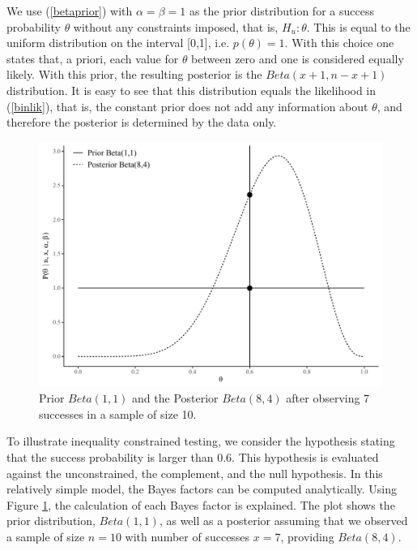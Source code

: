 \documentclass[11pt,reqno]{article}
\begin{document}
We use (\ref{betaprior}) with $\alpha=\beta=1$ as the prior distribution for a success probability $\theta$ without any constraints imposed, that is,  $H_u: \theta$. This is equal to the uniform distribution on the interval [0,1], i.e. $p(\theta) = 1$. With this choice one states that, a priori, each value for $\theta$ between zero and one is considered equally likely. With this prior, the resulting posterior is the $Beta(x+1, n-x+1)$ distribution. It is easy to see that this distribution equals the likelihood in (\ref{binlik}), that is, the constant prior does not add any information about $\theta$, and therefore the posterior is determined by the data only.

\begin{figure}[ht]
 \centerline{\includegraphics[width=12cm]{r-files-bes-klugkist-volker-2022/Figures/betaplot}}
 \caption{Prior $Beta(1,1)$ and the Posterior $Beta(8,4)$ after observing 7 successes in a sample of size 10.}
 \label{betaplot}
\end{figure}

To illustrate inequality constrained testing, we consider the hypothesis stating that the success probability is larger than 0.6.
This hypothesis is evaluated against the unconstrained, the complement, and the null hypothesis. In this relatively simple model, the Bayes factors can be computed analytically. Using Figure \ref{betaplot}, the calculation of each Bayes factor is explained. The plot shows the prior distribution, $Beta(1,1)$, as well as a posterior assuming that we observed a sample of size $n=10$ with number of successes $x=7$, providing $Beta(8,4)$.
\end{document}
